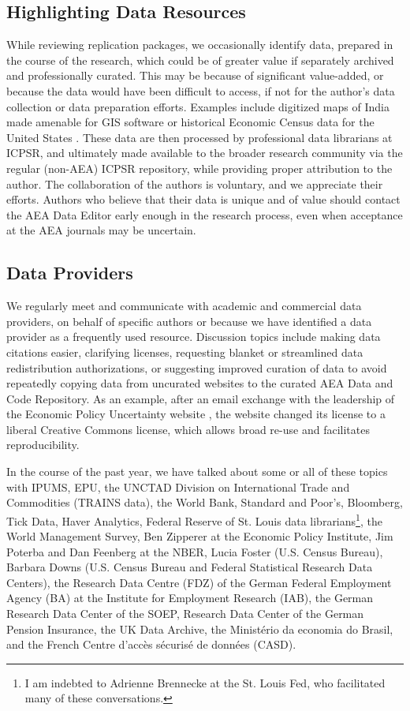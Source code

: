 \documentclass[PP]{AEA}
\newcommand{\aeadcr}{AEA Data and Code Repository}
\begin{document}
\subsection{Highlighting Data Resources}

While reviewing replication packages, we occasionally identify data, prepared in the course of the research, which could be of greater value if separately archived and professionally curated. This may be because of significant value-added, or because the data would have been difficult to access, if not for the author's data collection or data preparation efforts. Examples include digitized maps of India made amenable for GIS software \citep{10.1257/aer.20171673} or historical Economic Census data for the United States \citep{ganapati2020}. These data are then processed by professional data librarians at ICPSR, and ultimately made available to the broader research community via the regular (non-AEA) ICPSR repository, while providing proper attribution to the author. The collaboration of the authors is voluntary, and we appreciate their efforts. Authors who believe that their data is unique and of value should contact the AEA Data Editor early enough in the research process, even when acceptance at the AEA journals may be uncertain. 

\subsection{Data Providers}
\label{sec:producers}

We regularly meet and communicate with academic and commercial data providers, on behalf of specific authors or because we have identified a data provider as a frequently used resource. Discussion topics include making data citations easier, clarifying licenses, requesting blanket or streamlined data redistribution authorizations, or suggesting improved curation of data to avoid repeatedly copying data from uncurated websites to the curated \aeadcr{}. As an example, after an email exchange with the leadership of the Economic Policy Uncertainty website \citep{10.1093/qje/qjw024}, the website changed its license to a liberal Creative Commons license, which allows broad re-use and facilitates reproducibility.

In the course of the past year, we have talked about some or all of these topics with IPUMS, EPU, the UNCTAD Division on International Trade and Commodities (TRAINS data), the World Bank, Standard and Poor's, Bloomberg, Tick Data, Haver Analytics, Federal Reserve of St. Louis data librarians\footnote{I am indebted to  Adrienne Brennecke at the St. Louis Fed, who facilitated many of these conversations.}, the World Management Survey, Ben Zipperer at the Economic Policy Institute, Jim Poterba and Dan Feenberg at the NBER, Lucia Foster (U.S. Census Bureau), Barbara Downs (U.S. Census Bureau and Federal Statistical Research Data Centers), the Research Data Centre (FDZ) of the German Federal Employment Agency (BA) at the Institute for Employment Research (IAB), the German Research Data Center of the SOEP, Research Data Center of the German Pension Insurance, the UK Data Archive, the Ministério da economia do Brasil, and the French Centre d'accès sécurisé de données (CASD). 
\end{document}
